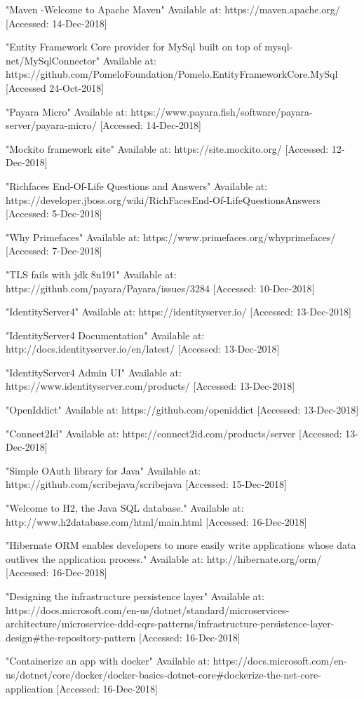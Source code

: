  "Maven -Welcome to Apache Maven"
Available at: https://maven.apache.org/ [Accessed: 14-Dec-2018]

 "Entity Framework Core provider for MySql built on top of mysql-net/MySqlConnector"
Available at: https://github.com/PomeloFoundation/Pomelo.EntityFrameworkCore.MySql
[Accessed 24-Oct-2018]

 "Payara Micro"
Available at: https://www.payara.fish/software/payara-server/payara-micro/ [Accessed: 14-Dec-2018]

 "Mockito framework site"
Available at: https://site.mockito.org/ [Accessed: 12-Dec-2018]

 "Richfaces End-Of-Life Questions and Answers"
Available at: https://developer.jboss.org/wiki/RichFacesEnd-Of-LifeQuestionsAnswers [Accessed: 5-Dec-2018]

 "Why Primefaces"
Available at: https://www.primefaces.org/whyprimefaces/ [Accessed: 7-Dec-2018]

 "TLS fails with jdk 8u191" Available at: https://github.com/payara/Payara/issues/3284 [Accessed: 10-Dec-2018]

 "IdentityServer4" Available at: https://identityserver.io/ [Accessed: 13-Dec-2018]

 "IdentityServer4 Documentation" Available at: http://docs.identityserver.io/en/latest/ [Accessed: 13-Dec-2018]

 "IdentityServer4 Admin UI" Available at: https://www.identityserver.com/products/ [Accessed: 13-Dec-2018]

 "OpenIddict" Available at: https://github.com/openiddict [Accessed: 13-Dec-2018]

 "Connect2Id" Available at: https://connect2id.com/products/server [Accessed: 13-Dec-2018]

 "Simple OAuth library for Java" Available at: https://github.com/scribejava/scribejava [Accessed: 15-Dec-2018]

 "Welcome to H2, the Java SQL database." Available at: http://www.h2database.com/html/main.html [Accessed: 16-Dec-2018]

 "Hibernate ORM enables developers to more easily write applications whose data outlives the application process." Available at: http://hibernate.org/orm/ [Accessed: 16-Dec-2018]

 "Designing the infrastructure persistence layer" Available at: https://docs.microsoft.com/en-us/dotnet/standard/microservices-architecture/microservice-ddd-cqrs-patterns/infrastructure-persistence-layer-design#the-repository-pattern [Accessed: 16-Dec-2018]

 "Containerize an app with docker" Available at: https://docs.microsoft.com/en-us/dotnet/core/docker/docker-basics-dotnet-core#dockerize-the-net-core-application [Accessed: 16-Dec-2018]
